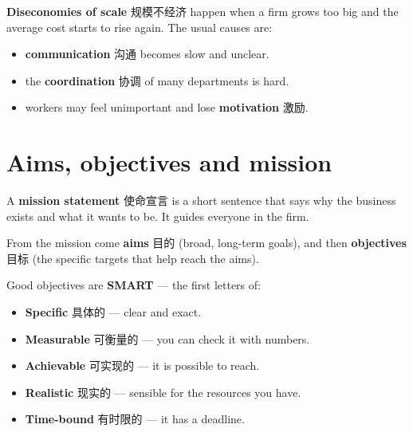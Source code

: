 \documentclass[11pt]{article}
\begin{document}
\begin{center}
\end{center}

\textbf{Diseconomies of scale} 规模不经济 happen when a firm grows too big and the average cost starts to rise again. The usual causes are:

\begin{itemize}
\item \textbf{communication} 沟通 becomes slow and unclear.

\item the \textbf{coordination} 协调 of many departments is hard.

\item workers may feel unimportant and lose \textbf{motivation} 激励.

\end{itemize}

\section*{Aims, objectives and mission}

A \textbf{mission statement} 使命宣言 is a short sentence that says why the business exists and what it wants to be. It guides everyone in the firm.

From the mission come \textbf{aims} 目的 (broad, long-term goals), and then \textbf{objectives} 目标 (the specific targets that help reach the aims).

Good objectives are \textbf{SMART} — the first letters of:

\begin{itemize}
\item \textbf{Specific} 具体的 — clear and exact.

\item \textbf{Measurable} 可衡量的 — you can check it with numbers.

\item \textbf{Achievable} 可实现的 — it is possible to reach.

\item \textbf{Realistic} 现实的 — sensible for the resources you have.

\item \textbf{Time-bound} 有时限的 — it has a deadline.

\end{itemize}
\end{document}
